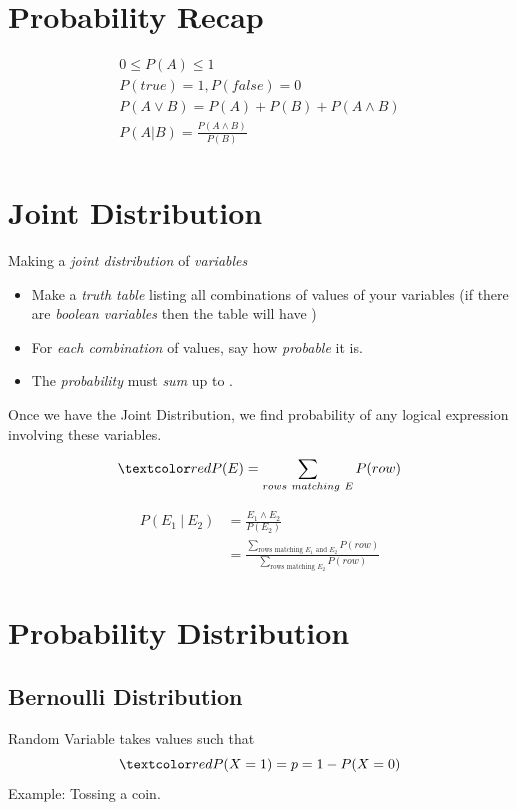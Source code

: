 \documentclass[
	number={3},
	title={Na\"iive Bayes Learning}
]{cs584notes}
\begin{document}
\section{Probability Recap}\label{sec:probability-recap}
\begin{gather*}
    0 \leq P(A) \leq 1\\
    P(true) = 1, P(false) = 0\\
    P(A \lor B) = P(A) + P(B) + P(A \land B)\\
    P(A|B) = \frac{P(A\land B)}{{P(B)}}\\
\end{gather*}

\section{Joint Distribution}\label{sec:joint-distribution}
Making a \emph{joint distribution} of  \emph{variables}
\begin{itemize}
	\item Make a \emph{truth table} listing all combinations of values of your variables (if there are  \emph{boolean variables} then the table will have )
	\item For \emph{each combination} of values, say how \emph{probable} it is.
	\item The \emph{probability} must \emph{sum} up to .
\end{itemize}

Once we have the Joint Distribution, we find probability of any logical expression involving these variables.

\[ \data{P(E) = \sum_{rows\ matching\ E}P(row)} \]

\begin{equation}
	\begin{aligned}
		P(E_{1}\ |\ E_{2}) &= \frac{E_{1} \land E_{2}}{P(E_{2})}\\
		&= \frac{\sum_{\mbox{rows matching } E_{1} \mbox{ and } E_{2}}P(row)}{\sum_{\mbox{rows matching } E_{2}}P(row)}
	\end{aligned}
	\label{eq:evidence-based-probability}
\end{equation}

\section{Probability Distribution}\label{sec:probability-distribution}
\subsection{Bernoulli Distribution}\label{subsec:bernoulli-distribution}
Random Variable  takes values  such that
\[ \data{ P(X=1) = p = 1 - P(X=0) } \]
Example: Tossing a coin.
\end{document}
